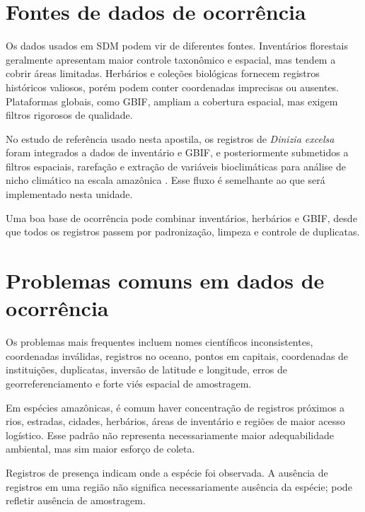 \section{Fontes de dados de ocorrência}

Os dados usados em SDM podem vir de diferentes fontes. Inventários florestais geralmente apresentam maior controle taxonômico e espacial, mas tendem a cobrir áreas limitadas. Herbários e coleções biológicas fornecem registros históricos valiosos, porém podem conter coordenadas imprecisas ou ausentes. Plataformas globais, como GBIF, ampliam a cobertura espacial, mas exigem filtros rigorosos de qualidade.

No estudo de referência usado nesta apostila, os registros de \textit{Dinizia excelsa} foram integrados a dados de inventário e GBIF, e posteriormente submetidos a filtros espaciais, rarefação e extração de variáveis bioclimáticas para análise de nicho climático na escala amazônica \parencite{delima2026warmer}. Esse fluxo é semelhante ao que será implementado nesta unidade.

\begin{dica}[title={\faLightbulb\quad Integração de fontes}]
	Uma boa base de ocorrência pode combinar inventários, herbários e GBIF, desde que todos os registros passem por padronização, limpeza e controle de duplicatas.
\end{dica}

\section{Problemas comuns em dados de ocorrência}

Os problemas mais frequentes incluem nomes científicos inconsistentes, coordenadas inválidas, registros no oceano, pontos em capitais, coordenadas de instituições, duplicatas, inversão de latitude e longitude, erros de georreferenciamento e forte viés espacial de amostragem.

Em espécies amazônicas, é comum haver concentração de registros próximos a rios, estradas, cidades, herbários, áreas de inventário e regiões de maior acesso logístico. Esse padrão não representa necessariamente maior adequabilidade ambiental, mas sim maior esforço de coleta.

\begin{atencao}[title={\faExclamationTriangle\quad Ocorrência não é ausência}]
	Registros de presença indicam onde a espécie foi observada. A ausência de registros em uma região não significa necessariamente ausência da espécie; pode refletir ausência de amostragem.
\end{atencao}

